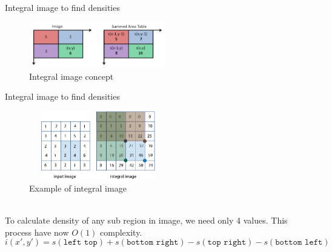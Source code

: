 \documentclass[8pt]{beamer}
\begin{document}
{{\begin{frame}{Integral image to find densities}
 \begin{figure}
\includegraphics[width=6cm, height=2cm]{images/integralimage.png}%
\caption{Integral image concept}%
{\small \color{gray}{[Photo credit: https://computersciencesource.wordpress.com]}}
\end{figure}
\end{frame}

\begin{frame}{Integral image to find densities}
 \begin{figure}
\includegraphics[width=6cm, height=3cm]{images/integral_image_b.png}%
\caption{Example of integral image}%
{\small \color{gray}{[Photo credit: https://www.mathworks.com]}}
\end{figure}\\[5pt]
To calculate density of any sub region in image, we need only 4 values. This process have now $O(1)$ complexity.
\begin{equation*}
 i(x\prime,y\prime) = s(\texttt{left top}) + s(\texttt{bottom right}) - s(\texttt{top right}) - s(\texttt{bottom left})
\end{equation*}
\end{frame}


}}
\end{document}
